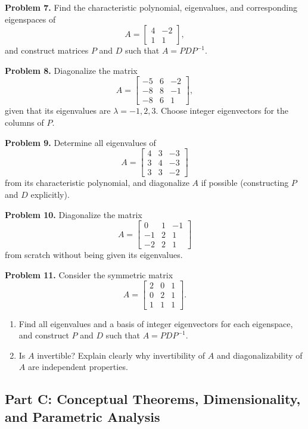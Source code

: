 \documentclass[11pt, letterpaper]{article}
\theoremstyle{definition}
\theoremstyle{remark}
\begin{document}
\textbf{Problem 7.}\label{prob:7}
Find the characteristic polynomial, eigenvalues, and corresponding eigenspaces of
\[
A = \begin{bmatrix} 4 & -2 \\ 1 & 1 \end{bmatrix},
\]
and construct matrices $P$ and $D$ such that $A = PDP^{-1}$.

\textbf{Problem 8.}\label{prob:8}
Diagonalize the matrix
\[
A = \begin{bmatrix} -5 & 6 & -2 \\ -8 & 8 & -1 \\ -8 & 6 & 1 \end{bmatrix},
\]
given that its eigenvalues are $\lambda = -1, 2, 3$. Choose integer eigenvectors for the columns of $P$.

\textbf{Problem 9.}\label{prob:9}
Determine all eigenvalues of
\[
A = \begin{bmatrix} 4 & 3 & -3 \\ 3 & 4 & -3 \\ 3 & 3 & -2 \end{bmatrix}
\]
from its characteristic polynomial, and diagonalize $A$ if possible (constructing $P$ and $D$ explicitly).

\textbf{Problem 10.}\label{prob:10}
Diagonalize the matrix
\[
A = \begin{bmatrix} 0 & 1 & -1 \\ -1 & 2 & 1 \\ -2 & 2 & 1 \end{bmatrix}
\]
from scratch without being given its eigenvalues.

\textbf{Problem 11.}\label{prob:11}
Consider the symmetric matrix
\[
A = \begin{bmatrix} 2 & 0 & 1 \\ 0 & 2 & 1 \\ 1 & 1 & 1 \end{bmatrix}.
\]
\begin{enumerate}[label=(\alph*)]
    \item Find all eigenvalues and a basis of integer eigenvectors for each eigenspace, and construct $P$ and $D$ such that $A = PDP^{-1}$.
    \item Is $A$ invertible? Explain clearly why invertibility of $A$ and diagonalizability of $A$ are independent properties.
\end{enumerate}

\subsection{Part C: Conceptual Theorems, Dimensionality, and Parametric Analysis}
\end{document}
